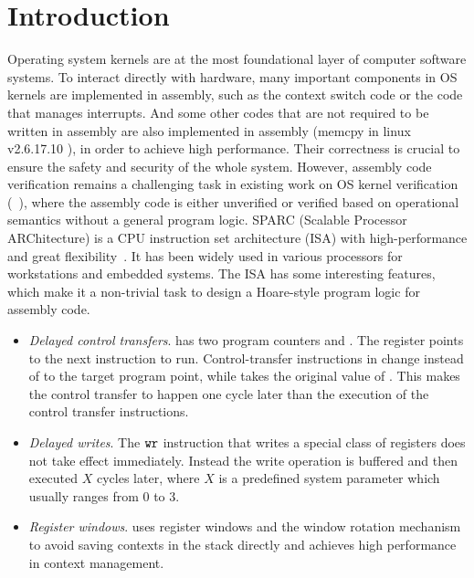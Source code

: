 \section{Introduction}

Operating system kernels are at
the most foundational layer of computer software systems.
To interact directly with hardware,
many important components in OS kernels are implemented
in assembly, such as the context switch code or the code that
manages interrupts. And some other codes that are not required to
be written in assembly are also implemented in assembly
(\eg \textsf{memcpy} in linux v2.6.17.10 \cite{linuxv2.6.17.10}), 
in order to achieve high performance.   
Their correctness is crucial to ensure
the safety and security of the whole system.
However, assembly code verification remains a challenging
task in existing work on OS kernel verification
(\eg~\cite{Xu16cav, sel4, deepspec}),
where the assembly code is either unverified or verified based on
operational semantics without a general program logic.
SPARC (Scalable Processor ARChitecture)
is a CPU instruction set architecture (ISA) with high-performance
and great flexibility~\cite{sparc}.
It has been widely used in various processors
for workstations and embedded systems. %
The \sparc{} ISA has some interesting features, which
make it a non-trivial task to design a Hoare-style
program logic for assembly code.

\begin{itemize}
	\item \textit{Delayed control transfers}.
	\sparc{} has two program counters \pc{} and \npc.
    The \npc{} register points to the next instruction
    to run.
	Control-transfer instructions in \sparc{}
	change \npc{} instead of \pc{} to the target program point,
    while \pc{} takes the original value of \npc.
	This makes the control transfer to happen one cycle later
    than the execution of the control transfer instructions.
	
	\item \textit{Delayed writes}.
	The $\texttt{wr}$ instruction that writes a special class
    of registers
    does not take effect immediately.
    Instead the write operation is buffered
    and then executed $X$ cycles later, where $X$ is a
    predefined
    system parameter which usually ranges from 0 to 3.
	\item \textit{Register windows}.
	\sparc{} uses register windows
	and the window rotation mechanism
	to avoid saving contexts in the stack directly
	and achieves high performance in context management.
\end{itemize}


